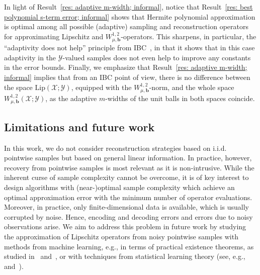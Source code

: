 \documentclass[namedate,webpdf]{ima-authoring-template-blank}
\newcommand*{\Lip}{\mathrm{Lip}}  %
\numberwithin{counter}{section}
\numberwithin{equation}{section}
\theoremstyle{plain}
\theoremstyle{definition}
\newcommand*{\cX}{\mathcal{X}}
\newcommand*{\cY}{\mathcal{Y}}
\theoremstyle{thmstyletwo}
\begin{document}
In light of Result~\ref{res: adaptive m-width; informal}, notice that Result~\ref{res: best polynomial s-term error; informal} shows that Hermite polynomial approximation is optimal among all possible (adaptive) sampling and reconstruction operators for approximating Lipschitz and \(W_{\mu, \bm{b}}^{1,2}\)-operators. This sharpens, in particular, the ``adaptivity does not help'' principle from IBC~\citep{novak_PowerAdaption_1996}, in that it shows that in this case adaptivity in the \(\cY\)-valued samples does not even help to improve any constants in the error bounds. Finally, we emphasize that Result~\ref{res: adaptive m-width; informal} implies that from an IBC point of view, there is no difference between the space \(\Lip(\cX; \cY)\), equipped with the \(W_{\mu, \bm{b}}^{1,2}\)-norm, and the whole space \(W_{\mu, \bm{b}}^{1,2}(\cX; \cY)\), as the adaptive \(m\)-widths of the unit balls in both spaces coincide. 



\subsection{Limitations and future work}
\label{subsec: limitations and future work}

In this work, we do not consider reconstruction strategies based on i.i.d. pointwise samples but based on general linear information. 
In practice, however, recovery from pointwise samples is most relevant as it is non-intrusive. While the inherent curse of sample complexity cannot be overcome, it is of key interest to design algorithms with (near-)optimal sample complexity which achieve an optimal approximation error with the minimum number of operator evaluations. Moreover, in practice, only finite-dimensional data is available, which is usually corrupted by noise.  Hence, encoding and decoding errors and errors due to noisy observations arise. We aim to address this problem in future work by studying the approximation of Lipschitz operators from noisy pointwise samples with methods from machine learning, e.g., in terms of practical existence theorems, as studied in~\citet{adcock_LearningSmoothFunctionsHigh_2024, adcock_OptimalDeepLearningHolomorphic_2024, adcock_NearoptimalLearningBanachvaluedHighdimensional_2025} and~\citet{franco_PracticalExistenceTheoremReduced_2025}, or with techniques from statistical learning theory (see, e.g.,~\citet{schmidt-hieber_NonparametricRegressionUsingDeep_2020} and~\cite{liu_DeepNonparametricEstimationOperators_2024}). 
\end{document}
